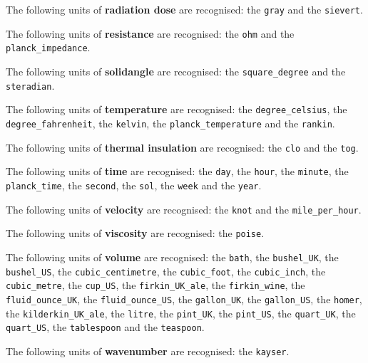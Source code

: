 \noindent The following units of {\bf radiation dose} are recognised:\newline
\noindent the {\tt gray} and the {\tt sievert}.\vspace{5mm}

\noindent The following units of {\bf resistance} are recognised:\newline
\noindent the {\tt ohm} and the {\tt planck\_\-impedance}.\vspace{5mm}

\noindent The following units of {\bf solidangle} are recognised:\newline
\noindent the {\tt square\_\-degree} and the {\tt steradian}.\vspace{5mm}

\noindent The following units of {\bf temperature} are recognised:\newline
\noindent the {\tt degree\_\-celsius}, the {\tt degree\_\-fahrenheit}, the {\tt kelvin}, the {\tt planck\_\-temperature} and the {\tt rankin}.\vspace{5mm}

\noindent The following units of {\bf thermal insulation} are recognised:\newline
\noindent the {\tt clo} and the {\tt tog}.\vspace{5mm}

\noindent The following units of {\bf time} are recognised:\newline
\noindent the {\tt day}, the {\tt hour}, the {\tt minute}, the {\tt planck\_\-time}, the {\tt second}, the {\tt sol}, the {\tt week} and the {\tt year}.\vspace{5mm}

\noindent The following units of {\bf velocity} are recognised:\newline
\noindent the {\tt knot} and the {\tt mile\_\-per\_\-hour}.\vspace{5mm}

\noindent The following units of {\bf viscosity} are recognised:\newline
\noindent the {\tt poise}.\vspace{5mm}

\noindent The following units of {\bf volume} are recognised:\newline
\noindent the {\tt bath}, the {\tt bushel\_\-UK}, the {\tt bushel\_\-US}, the {\tt cubic\_\-centimetre}, the {\tt cubic\_\-foot}, the {\tt cubic\_\-inch}, the {\tt cubic\_\-metre}, the {\tt cup\_\-US}, the {\tt firkin\_\-UK\_\-ale}, the {\tt firkin\_\-wine}, the {\tt fluid\_\-ounce\_\-UK}, the {\tt fluid\_\-ounce\_\-US}, the {\tt gallon\_\-UK}, the {\tt gallon\_\-US}, the {\tt homer}, the {\tt kilderkin\_\-UK\_\-ale}, the {\tt litre}, the {\tt pint\_\-UK}, the {\tt pint\_\-US}, the {\tt quart\_\-UK}, the {\tt quart\_\-US}, the {\tt tablespoon} and the {\tt teaspoon}.\vspace{5mm}

\noindent The following units of {\bf wavenumber} are recognised:\newline
\noindent the {\tt kayser}.\vspace{5mm}
